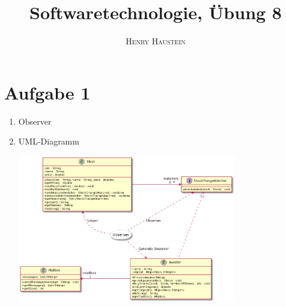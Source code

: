 \documentclass{article}
\title{\textbf{Softwaretechnologie, Übung 8}}
\author{\textsc{Henry Haustein}}
\date{}
\begin{document}
	\maketitle
	
	\section*{Aufgabe 1}
	\begin{enumerate}[label=(\alph*)]
		\item Observer
		\item UML-Diagramm
		\begin{center}
			\includegraphics[width=0.75\textwidth]{./Aufgabe8_1}
		\end{center}
	\end{enumerate}
\end{document}
